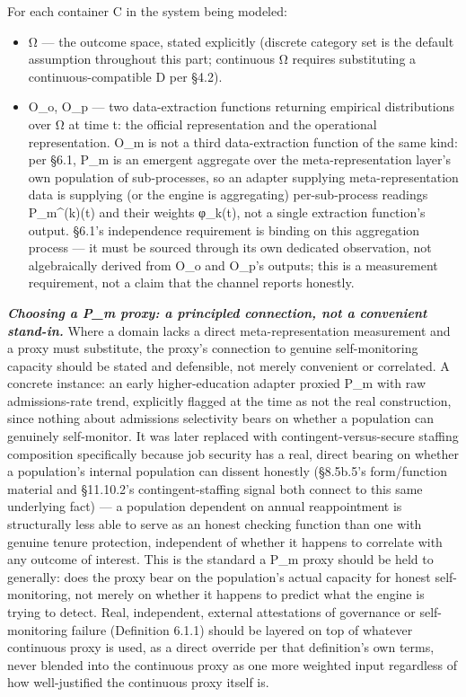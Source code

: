 \documentclass[
]{article}
\begin{document}
For each container C in the system being modeled:

\begin{itemize}
\item
  Ω --- the outcome space, stated explicitly (discrete category set is
  the default assumption throughout this part; continuous Ω requires
  substituting a continuous-compatible D per §4.2).
\item
  O\_o, O\_p --- two data-extraction functions returning empirical
  distributions over Ω at time t: the official representation and the
  operational representation. O\_m is not a third data-extraction
  function of the same kind: per §6.1, P\_m is an emergent aggregate
  over the meta-representation layer's own population of sub-processes,
  so an adapter supplying meta-representation data is supplying (or the
  engine is aggregating) per-sub-process readings P\_m\^{}(k)(t) and
  their weights φ\_k(t), not a single extraction function's output.
  §6.1's independence requirement is binding on this aggregation process
  --- it must be sourced through its own dedicated observation, not
  algebraically derived from O\_o and O\_p's outputs; this is a
  measurement requirement, not a claim that the channel reports
  honestly.
\end{itemize}

\emph{\textbf{Choosing a P\_m proxy: a principled connection, not a
convenient stand-in.}} Where a domain lacks a direct meta-representation
measurement and a proxy must substitute, the proxy's connection to
genuine self-monitoring capacity should be stated and defensible, not
merely convenient or correlated. A concrete instance: an early
higher-education adapter proxied P\_m with raw admissions-rate trend,
explicitly flagged at the time as not the real construction, since
nothing about admissions selectivity bears on whether a population can
genuinely self-monitor. It was later replaced with
contingent-versus-secure staffing composition specifically because job
security has a real, direct bearing on whether a population's internal
population can dissent honestly (§8.5b.5's form/function material and
§11.10.2's contingent-staffing signal both connect to this same
underlying fact) --- a population dependent on annual reappointment is
structurally less able to serve as an honest checking function than one
with genuine tenure protection, independent of whether it happens to
correlate with any outcome of interest. This is the standard a P\_m
proxy should be held to generally: does the proxy bear on the
population's actual capacity for honest self-monitoring, not merely on
whether it happens to predict what the engine is trying to detect. Real,
independent, external attestations of governance or self-monitoring
failure (Definition 6.1.1) should be layered on top of whatever
continuous proxy is used, as a direct override per that definition's own
terms, never blended into the continuous proxy as one more weighted
input regardless of how well-justified the continuous proxy itself is.
\end{document}
